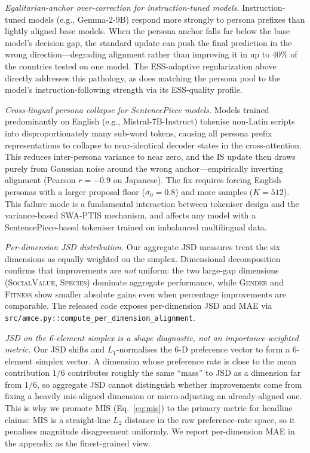 \documentclass{article}
\begin{document}
\emph{Egalitarian-anchor over-correction for instruction-tuned models.}
Instruction-tuned models (e.g., Gemma-2-9B) respond more strongly to persona
prefixes than lightly aligned base models. When the persona anchor falls far below
the base model's decision gap, the standard update can push the final prediction
in the wrong direction---degrading alignment rather than improving it in up to
40\% of the countries tested on one model. The ESS-adaptive regularization above
directly addresses this pathology, as does matching the persona pool to the
model's instruction-following strength via its ESS-quality profile.

\emph{Cross-lingual persona collapse for SentencePiece models.}
Models trained predominantly on English (e.g., Mistral-7B-Instruct) tokenise
non-Latin scripts into disproportionately many sub-word tokens, causing all
persona prefix representations to collapse to near-identical decoder states in the
cross-attention. This reduces inter-persona variance to near zero, and the IS
update then draws purely from Gaussian noise around the wrong anchor---empirically
inverting alignment (Pearson $r = -0.9$ on Japanese). The fix requires forcing
English personas with a larger proposal floor ($\sigma_0{=}0.8$) and more samples
($K{=}512$). This failure mode is a fundamental interaction between tokeniser design
and the variance-based SWA-PTIS mechanism, and affects any model with a
SentencePiece-based tokeniser trained on imbalanced multilingual data.

\emph{Per-dimension JSD distribution.}
Our aggregate JSD measures treat the six dimensions as equally weighted on the
simplex. Dimensional decomposition confirms that improvements are
\emph{not} uniform: the two large-gap dimensions (\textsc{SocialValue}, \textsc{Species})
dominate aggregate performance, while \textsc{Gender} and \textsc{Fitness} show
smaller absolute gains even when percentage improvements are comparable. The
released code exposes per-dimension JSD and MAE via
\texttt{src/amce.py::compute\_per\_dimension\_alignment}.

\emph{JSD on the 6-element simplex is a shape diagnostic, not an
importance-weighted metric.} Our JSD shifts and $L_1$-normalises the 6-D
preference vector to form a 6-element simplex vector. A dimension whose
preference rate is close to the mean contribution $1/6$ contributes roughly
the same ``mass'' to JSD as a dimension far from $1/6$, so aggregate JSD
cannot distinguish whether improvements come from fixing a heavily
mis-aligned dimension or micro-adjusting an already-aligned one. This is why
we promote MIS (Eq.~\ref{eq:mis}) to the primary metric for headline claims:
MIS is a straight-line $L_2$ distance in the raw preference-rate space, so it
penalises magnitude disagreement uniformly. We report per-dimension MAE in the
appendix as the finest-grained view.
\end{document}
